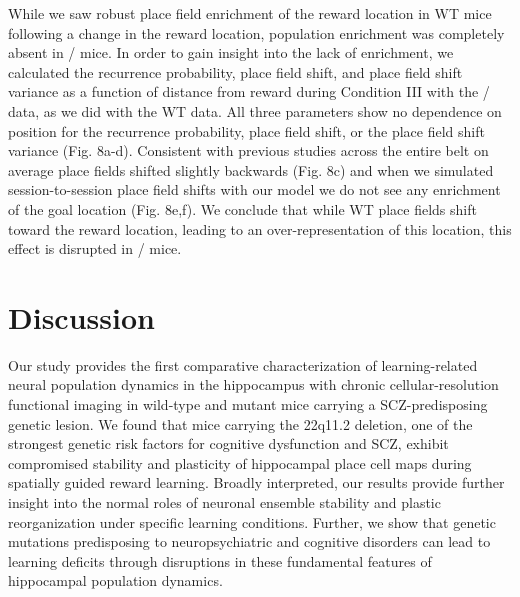 While we saw robust place field enrichment of the reward location in WT mice following a change in the reward location, population enrichment was completely absent in \df/ mice. In order to gain insight into the lack of enrichment, we calculated the recurrence probability, place field shift, and place field shift variance as a function of distance from reward during Condition III with the \df/ data, as we did with the WT data. All three parameters show no dependence on position for the recurrence probability, place field shift, or the place field shift variance (Fig. 8a-d). Consistent with previous studies \citep{Mehta1997} across the entire belt on average place fields shifted slightly backwards (Fig. 8c) and when we simulated session-to-session place field shifts with our model we do not see any enrichment of the goal location (Fig. 8e,f). We conclude that while WT place fields shift toward the reward location, leading to an over-representation of this location, this effect is disrupted in \df/ mice.

\section{Discussion}

Our study provides the first comparative characterization of learning-related neural population dynamics in the hippocampus with chronic cellular-resolution functional imaging in wild-type and mutant mice carrying a SCZ-predisposing genetic lesion.  We found that mice carrying the 22q11.2 deletion, one of the strongest genetic risk factors for cognitive dysfunction and SCZ, exhibit compromised stability and plasticity of hippocampal place cell maps during spatially guided reward learning. Broadly interpreted, our results provide further insight into the normal roles of neuronal ensemble stability and plastic reorganization under specific learning conditions. Further, we show that genetic mutations predisposing to neuropsychiatric and cognitive disorders can lead to learning deficits through disruptions in these fundamental features of hippocampal population dynamics. 

